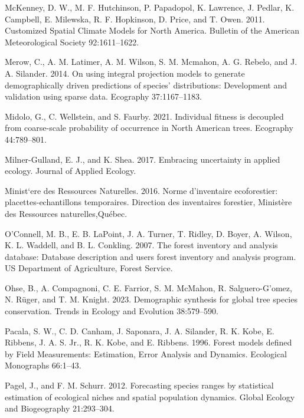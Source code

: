 \documentclass[12pt]{article}
\newlength{\cslhangindent}
\newenvironment{cslreferences}%
  {\setlength{\parindent}{0pt}%
  \everypar{\setlength{\hangindent}{\cslhangindent}}\ignorespaces}%
  {\par}
\begin{document}
\begin{cslreferences}
\leavevmode\hypertarget{ref-McKenney2011}{}%
McKenney, D. W., M. F. Hutchinson, P. Papadopol, K. Lawrence, J. Pedlar,
K. Campbell, E. Milewska, R. F. Hopkinson, D. Price, and T. Owen. 2011.
Customized Spatial Climate Models for North America. Bulletin of the
American Meteorological Society 92:1611--1622.

\leavevmode\hypertarget{ref-Merow2014}{}%
Merow, C., A. M. Latimer, A. M. Wilson, S. M. Mcmahon, A. G. Rebelo, and
J. A. Silander. 2014. On using integral projection models to generate
demographically driven predictions of species' distributions:
Development and validation using sparse data. Ecography 37:1167--1183.

\leavevmode\hypertarget{ref-Midolo2021}{}%
Midolo, G., C. Wellstein, and S. Faurby. 2021. Individual fitness is
decoupled from coarse-scale probability of occurrence in North American
trees. Ecography 44:789--801.

\leavevmode\hypertarget{ref-MilnerGulland2017a}{}%
Milner-Gulland, E. J., and K. Shea. 2017. Embracing uncertainty in
applied ecology. Journal of Applied Ecology.

\leavevmode\hypertarget{ref-Naturelles2016}{}%
Minist\a`ere des Ressources Naturelles. 2016. Norme d'inventaire
ecoforestier: placettes-echantillons temporaires. Direction des
inventaires forestier, Ministère des Ressources naturelles,Québec.

\leavevmode\hypertarget{ref-OConnell2007}{}%
O'Connell, M. B., E. B. LaPoint, J. A. Turner, T. Ridley, D. Boyer, A.
Wilson, K. L. Waddell, and B. L. Conkling. 2007. The forest inventory
and analysis database: Database description and users forest inventory
and analysis program. US Department of Agriculture, Forest Service.

\leavevmode\hypertarget{ref-Ohse2023}{}%
Ohse, B., A. Compagnoni, C. E. Farrior, S. M. McMahon, R.
Salguero-G\a'omez, N. Rüger, and T. M. Knight. 2023. Demographic
synthesis for global tree species conservation. Trends in Ecology and
Evolution 38:579--590.

\leavevmode\hypertarget{ref-Pacala1996a}{}%
Pacala, S. W., C. D. Canham, J. Saponara, J. A. Silander, R. K. Kobe, E.
Ribbens, J. A. S. Jr., R. K. Kobe, and E. Ribbens. 1996. Forest models
defined by Field Measurements: Estimation, Error Analysis and Dynamics.
Ecological Monographs 66:1--43.

\leavevmode\hypertarget{ref-Pagel2012}{}%
Pagel, J., and F. M. Schurr. 2012. Forecasting species ranges by
statistical estimation of ecological niches and spatial population
dynamics. Global Ecology and Biogeography 21:293--304.


\end{cslreferences}
\end{document}
